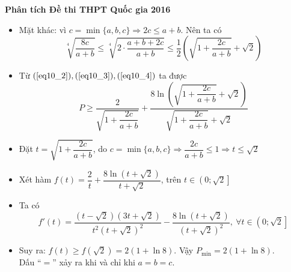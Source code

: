 \documentclass[11pt]{beamer} %
\newcommand\FontviTen{\fontsize{8.5}{7.2}\selectfont}
\begin{document}
\begin{frame}{\textbf{\qquad Phân tích Đề thi THPT Quốc gia 2016}}
	\FontviTen
	\begin{itemize}[<+-|structure@+>]
		\item Mặt khác: vì $c=\min\{a,b,c\}\Rightarrow 2c\leq a+b$. Nên ta có
		\begin{equation}\label{eq10_4}
		\sqrt[4]{\frac{8c}{a+b}}\leq \sqrt[4]{2\cdot\frac{a+b+2c}{a+b}}\leq\frac{1}{2} \left(\sqrt{1+\frac{2c}{a+b}}+\sqrt{2}\right)
		\end{equation}
		\item Từ $(\ref{eq10_2}), (\ref{eq10_3}), (\ref{eq10_4})$ ta được\\[-15pt]
		$$P\geq \frac{2}{\sqrt{1+\dfrac{2c}{a+b}}}+\frac{8\ln\left( \sqrt{1+\dfrac{2c}{a+b}}+\sqrt{2}\right)}{\sqrt{1+\dfrac{2c}{a+b}}+\sqrt{2}}$$
		\item Đặt $t=\sqrt{1+\dfrac{2c}{a+b}}$, do $c=\min\{a,b,c\}\Rightarrow \dfrac{2c}{a+b}\leq 1\Rightarrow t\leq \sqrt{2}$\\[10pt]
		\item Xét hàm $f(t)=\dfrac{2}{t}+\dfrac{8\ln\left(t+\sqrt{2}\right)}{t+\sqrt{2}}$, trên $t\in\left(0;\sqrt{2}\right]$\\[10pt]
		\item Ta có
		$$f'(t)=
		\frac{\left(t-\sqrt{2}\right)\left(3t+\sqrt{2}\right)}{t^2\left(t+\sqrt{2}\right)^2}-\frac{8\ln\left(t+ \sqrt{2}\right)}{\left(t+\sqrt{2}\right)^2},~\forall t\in\left(0;\sqrt{2}\right] 
		$$
		\item Suy ra: $f(t)\geq f(\sqrt{2})=2\left(1+\ln 8\right)$. Vậy $P_{\min} =2\left(1+\ln 8\right)$.\\[8pt]
		Dấu ``$=$'' xảy ra khi và chỉ khi $a=b=c$.
	\end{itemize}
\end{frame}
\end{document}
